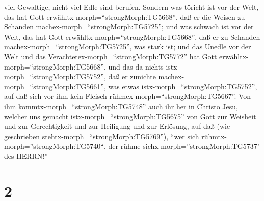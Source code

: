 viel Gewaltige, nicht viel Edle sind berufen.  Sondern was
töricht ist vor der Welt, das hat Gott
erwähltx-morph=``strongMorph:TG5668'', daß er die Weisen zu Schanden
machex-morph=``strongMorph:TG5725''; und was schwach ist vor der Welt,
das hat Gott erwähltx-morph=``strongMorph:TG5668'', daß er zu Schanden
machex-morph=``strongMorph:TG5725'', was stark ist;  und
das Unedle vor der Welt und das Verachtetex-morph=``strongMorph:TG5772''
hat Gott erwähltx-morph=``strongMorph:TG5668'', und das da nichts
istx-morph=``strongMorph:TG5752'', daß er zunichte
machex-morph=``strongMorph:TG5661'', was etwas
istx-morph=``strongMorph:TG5752'',  auf daß sich vor ihm
kein Fleisch rühmex-morph=``strongMorph:TG5667''.  Von ihm
kommtx-morph=``strongMorph:TG5748'' auch ihr her in Christo Jesu,
welcher uns gemacht istx-morph=``strongMorph:TG5675'' von Gott zur
Weisheit und zur Gerechtigkeit und zur Heiligung und zur Erlösung,
 auf daß (wie geschrieben
stehtx-morph=``strongMorph:TG5769''), ``wer sich
rühmtx-morph=''strongMorph:TG5740``, der rühme
sichx-morph=''strongMorph:TG5737" des HERRN!''

\hypertarget{section-1}{%
\section{2}\label{section-1}}


